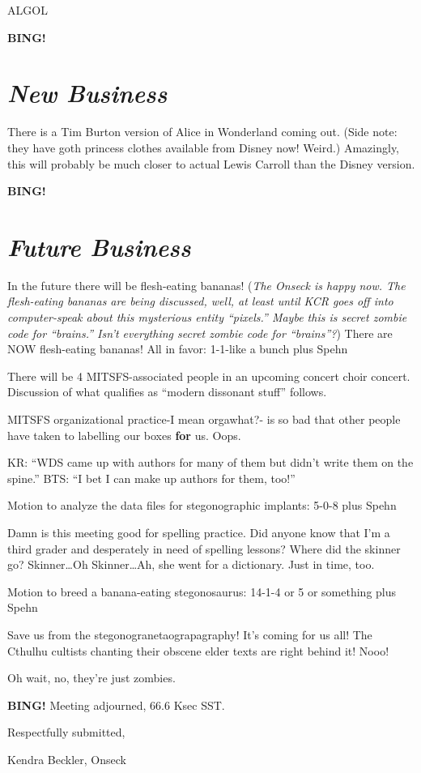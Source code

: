 \documentclass[10pt]{article}
\newcommand{\bing}{{\bf BING!} }
\newcommand{\goto}[1]{\bing \vskip 12pt \section*{{\em{#1}}}}
\newcommand{\ps}{ plus Spehn\xspace}
\newcommand{\onseck}{Kendra Beckler, Onseck}
\begin{document}
ALGOL

\goto{New Business}

There is a Tim Burton version of Alice in Wonderland coming out.  (Side note: they have goth princess clothes available from Disney now!  Weird.)  Amazingly, this will probably be much closer to actual Lewis Carroll than the Disney version.

\goto{Future Business}

In the future there will be flesh-eating bananas!  (\textit{The Onseck is happy now.  The flesh-eating bananas are being discussed, well, at least until KCR goes off into computer-speak about this mysterious entity ``pixels.''  Maybe this is secret zombie code for ``brains.''  Isn't everything secret zombie code for ``brains''?})  There are NOW flesh-eating bananas!  All in favor: 1-1-like a bunch \ps

There will be 4 MITSFS-associated people in an upcoming concert choir concert.  Discussion of what qualifies as ``modern dissonant stuff'' follows.

MITSFS organizational practice-I mean orgawhat?- is so bad that other people have taken to labelling our boxes \textbf{for} us.  Oops.

KR: ``WDS came up with authors for many of them but didn't write them on the spine.''
BTS: ``I bet I can make up authors for them, too!''

Motion to analyze the data files for stegonographic implants: 5-0-8 \ps

Damn is this meeting good for spelling practice.  Did anyone know that I'm a third grader and desperately in need of spelling lessons?  Where did the skinner go?  Skinner\ldots Oh Skinner\ldots  Ah, she went for a dictionary.  Just in time, too.

Motion to breed a banana-eating stegonosaurus: 14-1-4 or 5 or something \ps

Save us from the stegonogranetaograpagraphy!  It's coming for us all!  The Cthulhu cultists chanting their obscene elder texts are right behind it!  Nooo!

Oh wait, no, they're just zombies.

\bing
\noindent
Meeting adjourned, 66.6 Ksec SST.

\vspace{18pt}

\centerline{Respectfully submitted,}
\centerline{\onseck}
\end{document}
